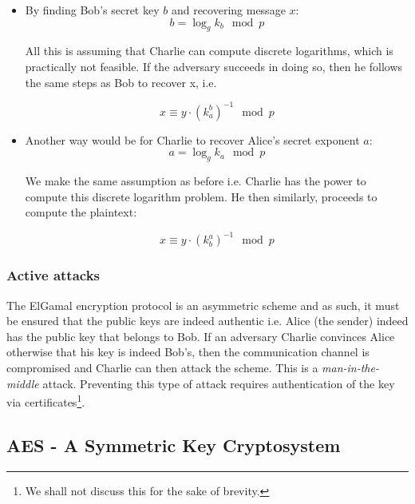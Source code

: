 \begin{itemize}
    \item By finding Bob's secret key \( b \) and recovering message \( x \):
        \begin{equation}
            b = \log_g k_b \mod p
        \end{equation}

        All this is assuming that Charlie can compute discrete logarithms, which is practically not feasible. 
        If the adversary succeeds in doing so, then he follows the same steps as Bob to recover x, i.e.

        \begin{equation}
            x \equiv y \cdot (k_a^b)^{-1} \mod p
        \end{equation}
        
    \item Another way would be for Charlie to recover Alice's secret exponent \( a \):
        \begin{equation}
            a = \log_g k_a \mod p
        \end{equation}
        
        We make the same assumption as before i.e. Charlie has the power to compute this discrete logarithm problem.
        He then similarly, proceeds to compute the plaintext:

        \begin{equation}
            x \equiv y \cdot (k_b^a)^{-1} \mod p     
        \end{equation}
\end{itemize}

\subsubsection{Active attacks}

The ElGamal encryption protocol is an asymmetric scheme and as such, it must be ensured that the public keys are indeed authentic i.e. Alice (the sender) indeed has the public key that belongs to Bob.
If an adversary Charlie convinces Alice otherwise that his key is indeed Bob's, then the communication channel is compromised and Charlie can then attack the scheme. 
This is a \textit{man-in-the-middle} attack.
Preventing this type of attack requires authentication of the key via certificates\footnote{We shall not discuss this for the sake of brevity.}.


\subsection{AES - A Symmetric Key Cryptosystem}

